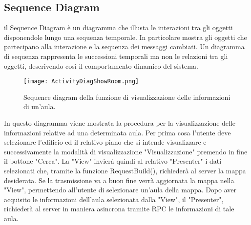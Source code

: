 \FloatBarrier
\subsection{Sequence Diagram}
il Sequence Diagram è un diagramma che illusta le interazioni tra gli oggetti disponendole lungo una sequenza temporale. In particolare mostra gli oggetti che partecipano alla interazione e la sequenza dei messaggi cambiati.
Un diagramma di sequenza rappresenta le successioni temporali ma non le relazioni tra gli oggetti, descrivendo così il comportamento dinamico del sistema.
\begin{figure}[!htb]
\centering%
\texttt{[image: ActivityDiagShowRoom.png]}%
\caption{Sequence diagram della funzione di visualizzazione delle informazioni di un'aula.}\label{fig:umlSeqDRoomInfo}%
\end{figure}
In questo diagramma viene mostrata la procedura per la visualizzazione delle informazioni relative ad una determinata aula. Per prima cosa l'utente deve selezionare l'edificio ed il relativo piano che si intende visualizzare e successivamente la modalità di visualizzazione "Visualizzazione" premendo in fine il bottone "Cerca". La "View" invierà quindi al relativo "Presenter" i dati selezionati che, tramite la funzione RequestBuild(), richiederà al server la mappa desiderata. Se la trasmissione va a buon fine verrà aggiornata la mappa nella "View", permettendo all'utente di selezionare un'aula  della mappa. Dopo aver acquisito le informazioni dell'aula selezionata dalla "View", il "Presenter", richiederà al server in maniera asincrona tramite RPC le informazioni di tale aula.
